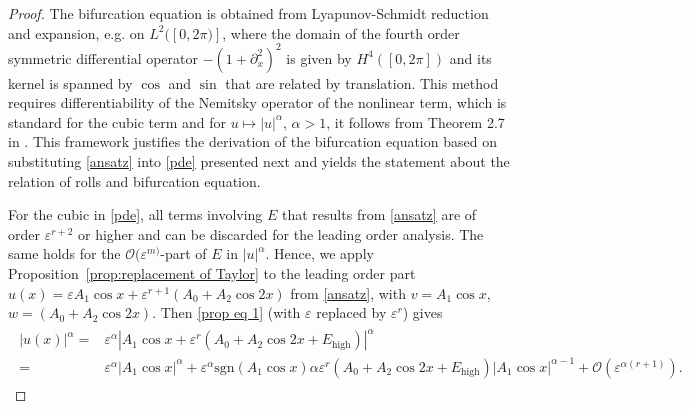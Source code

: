 \documentclass{article}
\numberwithin{equation}{section}
\def\eps{\varepsilon}
\def\calO{\mathcal{O}}
\begin{document}
\begin{proof}
The bifurcation equation is obtained from Lyapunov-Schmidt reduction and expansion, e.g. on $L^2([0,2\pi)]$, where the domain of the fourth order symmetric differential operator $-(1+\partial^2_x)^2$ is given by $H^4([0,2\pi])$ and its kernel is spanned by $\cos$ and $\sin$ that are related by translation. This method  requires differentiability of the Nemitsky operator of the nonlinear term, which is standard for the cubic term and for $u\mapsto |u|^\alpha$, $\alpha>1$,  it follows from Theorem 2.7 in \cite{AmbrosettiProdi1993}. This framework justifies the derivation of the bifurcation equation based on substituting \eqref{ansatz} into \eqref{pde} presented next and yields the statement about the relation of rolls and bifurcation equation. 

For the cubic in \eqref{pde}, all terms involving $E$ that results from \eqref{ansatz} are of order $\eps^{r+2}$ or higher and can  be discarded for the leading order analysis. The same holds for the $\calO(\eps^{m)}$-part of $E$ in $|u|^\alpha$. 
Hence, we apply Proposition~\ref{prop:replacement of Taylor} to the leading order part $u(x) = \eps A_1 \cos x + \eps^{r+1}(A_0 + A_2 \cos 2x)$ from \eqref{ansatz}, with $v=A_1 \cos x$, $w=(A_0 + A_2 \cos 2x)$. Then \eqref{prop eq 1} (with $\eps$ replaced by $\eps^r$) gives
		\begin{align}\label{e:ansatzest}
			\begin{split}
				|u(x)|^\alpha =& \varepsilon^\alpha |A_1 \cos x + \varepsilon^r(A_0 + A_2 \cos 2x +E_{\mathrm{high}} )|^\alpha \\
				=&\varepsilon^\alpha |A_1 \cos x|^\alpha + \varepsilon^{\alpha} \mathrm{sgn}( A_1 \cos x ) \alpha \varepsilon^r (A_0 + A_2 \cos 2x +E_{\mathrm{high}} ) |A_1 \cos x|^{\alpha-1} + \calO(\eps^{\alpha(r+1)}) .
			\end{split}
		\end{align}
 

\end{proof}
\end{document}
